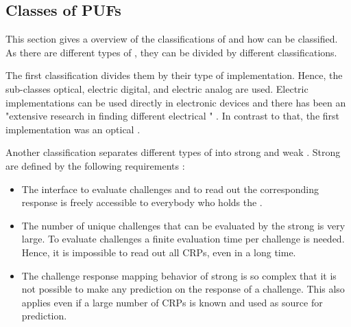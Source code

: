 

\subsection{Classes of PUFs}
\label{sec:classesofpufs}

This section gives a overview of the classifications of \pufs and how \apufs can be classified.
As there are different types of \pufs, they can be divided by different classifications. %

The first classification divides them by their type of implementation.
Hence, the sub-classes optical, electric digital, and electric analog are used.
Electric implementations can be used directly in electronic devices and there has been an "extensive research in finding different electrical \pufs" \cite{Becker2015ThePUFs}.
In contrast to that, the first \puf implementation was an optical \puf. %

Another classification separates different types of \pufs into strong and weak \pufs.
Strong \pufs are defined by the following requirements \cite{Ruhrmair2013PUFsEvaluations}:

\begin{itemize}
\item The interface to evaluate challenges and to read out the corresponding response is freely accessible to everybody who holds the \puf.
\item The number of unique challenges that can be evaluated by the strong \puf is very large.
To evaluate challenges a finite evaluation time per challenge is needed.
Hence, it is impossible to read out all \acp{CRP}, even in a long time.
\item The challenge response mapping behavior of strong \pufs is so complex that it is not possible to make any prediction on the response of a challenge. 
This also applies even if a large number of \acp{CRP} is known and used as source for prediction.
\end{itemize}

